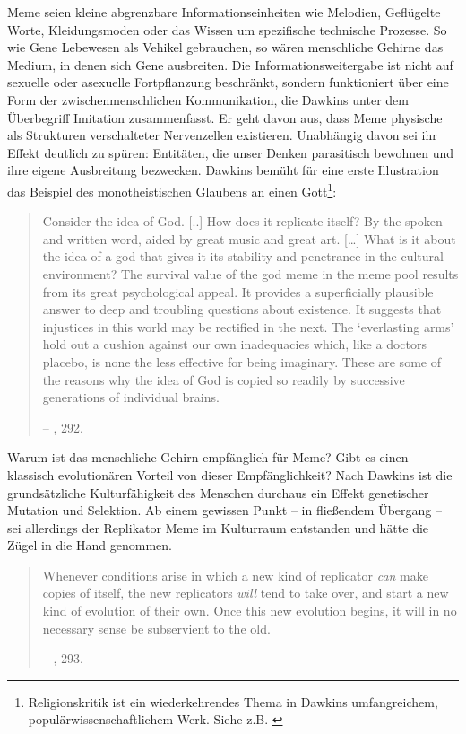 \documentclass[openany,twoside,twocolumn]{book}
\let\rmarkdownfootnote\footnote%
\def\footnote{\protect\rmarkdownfootnote}
\begin{document}
Meme seien kleine abgrenzbare Informationseinheiten wie Melodien,
Geflügelte Worte, Kleidungsmoden oder das Wissen um spezifische
technische Prozesse. So wie Gene Lebewesen als Vehikel gebrauchen, so
wären menschliche Gehirne das Medium, in denen sich Gene ausbreiten. Die
Informationsweitergabe ist nicht auf sexuelle oder asexuelle
Fortpflanzung beschränkt, sondern funktioniert über eine Form der
zwischenmenschlichen Kommunikation, die Dawkins unter dem Überbegriff
Imitation zusammenfasst. Er geht davon aus, dass Meme physische als
Strukturen verschalteter Nervenzellen existieren. Unabhängig davon sei
ihr Effekt deutlich zu spüren: Entitäten, die unser Denken parasitisch
bewohnen und ihre eigene Ausbreitung bezwecken. Dawkins bemüht für eine
erste Illustration das Beispiel des monotheistischen Glaubens an einen
Gott\footnote{Religionskritik ist ein wiederkehrendes Thema in Dawkins
  umfangreichem, populärwissenschaftlichem Werk. Siehe z.B.
  \textcite{dawkins_god_2006}}:

\begin{quote}
Consider the idea of God. {[}..{]} How does it replicate itself? By the
spoken and written word, aided by great music and great art.
{[}\ldots{}{]} What is it about the idea of a god that gives it its
stability and penetrance in the cultural environment? The survival value
of the god meme in the meme pool results from its great psychological
appeal. It provides a superficially plausible answer to deep and
troubling questions about existence. It suggests that injustices in this
world may be rectified in the next. The `everlasting arms' hold out a
cushion against our own inadequacies which, like a doctors placebo, is
none the less effective for being imaginary. These are some of the
reasons why the idea of God is copied so readily by successive
generations of individual brains.

-- \textcite{Dawkinsselfishgene40th2016}, 292.
\end{quote}

Warum ist das menschliche Gehirn empfänglich für Meme? Gibt es einen
klassisch evolutionären Vorteil von dieser Empfänglichkeit? Nach Dawkins
ist die grundsätzliche Kulturfähigkeit des Menschen durchaus ein Effekt
genetischer Mutation und Selektion. Ab einem gewissen Punkt -- in
fließendem Übergang -- sei allerdings der Replikator Meme im Kulturraum
entstanden und hätte die Zügel in die Hand genommen.

\begin{quote}
Whenever conditions arise in which a new kind of replicator \emph{can}
make copies of itself, the new replicators \emph{will} tend to take
over, and start a new kind of evolution of their own. Once this new
evolution begins, it will in no necessary sense be subservient to the
old.

-- \textcite{Dawkinsselfishgene40th2016}, 293.
\end{quote}
\end{document}
